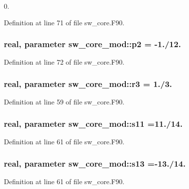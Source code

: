 0. 



Definition at line 71 of file sw\-\_\-core.\-F90.

\subsubsection[{p2}]{\setlength{\rightskip}{0pt plus 5cm}real, parameter sw\-\_\-core\-\_\-mod\-::p2 = -\/1./12.}\label{classsw__core__mod_a92790db4a243ddec101790808d27959c}


Definition at line 72 of file sw\-\_\-core.\-F90.

\subsubsection[{r3}]{\setlength{\rightskip}{0pt plus 5cm}real, parameter sw\-\_\-core\-\_\-mod\-::r3 = 1./3.}\label{classsw__core__mod_a2311c092079fcb5996c81f6a5bd4a19f}


Definition at line 59 of file sw\-\_\-core.\-F90.

\subsubsection[{s11}]{\setlength{\rightskip}{0pt plus 5cm}real, parameter sw\-\_\-core\-\_\-mod\-::s11 =11./14.}\label{classsw__core__mod_ab4edb6c8ca1754ab57e3b7c1dea01c40}


Definition at line 61 of file sw\-\_\-core.\-F90.

\subsubsection[{s13}]{\setlength{\rightskip}{0pt plus 5cm}real, parameter sw\-\_\-core\-\_\-mod\-::s13 =-\/13./14.}\label{classsw__core__mod_a2057f706d31454664b7e866bfb212b60}


Definition at line 61 of file sw\-\_\-core.\-F90.

